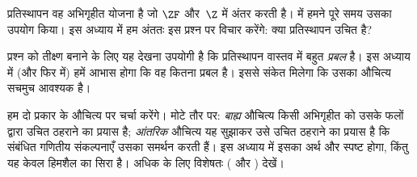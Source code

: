 \documentclass[../../../include/open-logic-section]{subfiles}
\begin{document}

प्रतिस्थापन वह अभिगृहीत योजना है जो $\ZF$ और~$\Z$ में अंतर करती है।
 में हमने पूरे समय उसका
उपयोग किया। इस अध्याय में हम अंततः इस प्रश्न पर विचार करेंगे: क्या
प्रतिस्थापन उचित है?

प्रश्न को तीक्ष्ण बनाने के लिए यह देखना उपयोगी है कि प्रतिस्थापन वास्तव में
बहुत \emph{प्रबल} है। इस अध्याय में (और फिर
 में) हमें आभास होगा कि वह कितना प्रबल
है। इससे संकेत मिलेगा कि उसका औचित्य सचमुच आवश्यक है।

हम दो प्रकार के औचित्य पर चर्चा करेंगे। मोटे तौर पर: \emph{बाह्य} औचित्य
किसी अभिगृहीत को उसके फलों द्वारा उचित ठहराने का प्रयास है; \emph{आंतरिक}
औचित्य यह सुझाकर उसे उचित ठहराने का प्रयास है कि संबंधित गणितीय संकल्पनाएँ
उसका समर्थन करती हैं। इस अध्याय में इसका अर्थ और स्पष्ट होगा, किंतु यह केवल
हिमशैल का सिरा है। अधिक के लिए विशेषतः \citeauthor{Maddy1988a}
(\citeyear{Maddy1988a} और \citeyear{Maddy1988b}) देखें।
\end{document}

